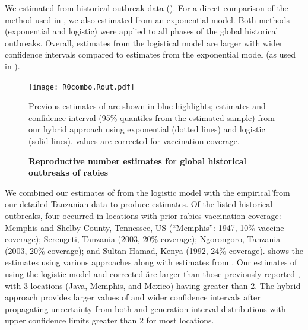 \FloatBarrier

We estimated \littler from historical outbreak data (). 
For a direct comparison of the method used in \citep{hampson2009transmission}, we also estimated \littler from an exponential model. Both methods (exponential and logistic) were applied to all phases of the global historical outbreaks. 
Overall, \littler estimates from the logistical model are larger with wider confidence intervals compared to \littler estimates from the exponential model (as used in \citep{hampson2009transmission}). 

\begin{center}
\begin{figure}[h]
\texttt{[image: R0combo.Rout.pdf]}
\caption{\textbf{Reproductive number estimates for global historical outbreaks of rabies}}
Previous estimates of \rzero are shown in blue highlights; \rzero estimates and confidence interval (95\% quantiles from the estimated \rzero sample) from our hybrid approach using exponential (dotted lines) and logistic (solid lines). \rzero values are corrected for vaccination coverage.
\end{figure}
\end{center}

\FloatBarrier

We combined our estimates of \littler from the logistic model with the empirical \G from our detailed Tanzanian data to produce \rzero estimates.
Of the listed historical outbreaks, four occurred in locations with prior rabies vaccination coverage: Memphis and Shelby County, Tennessee, US (``Memphis'': 1947, 10\% vaccine coverage); Serengeti, Tanzania (2003, 20\% coverage); Ngorongoro, Tanzania (2003, 20\% coverage); and Sultan Hamad, Kenya (1992, 24\% coverage).
 shows the \rzero estimates using various approaches along with estimates from \cite{hampson2009transmission}. 
Our estimates of \rzero using the logistic model and corrected \G are larger than those previously reported \citep{hampson2009transmission}, with 3 locations (Java, Memphis, and Mexico) having \rzero greater than 2.
The hybrid approach provides larger values of \rzero and wider confidence intervals after propagating uncertainty from both \littler and generation interval distributions with upper confidence limits greater than 2 for most locations.


